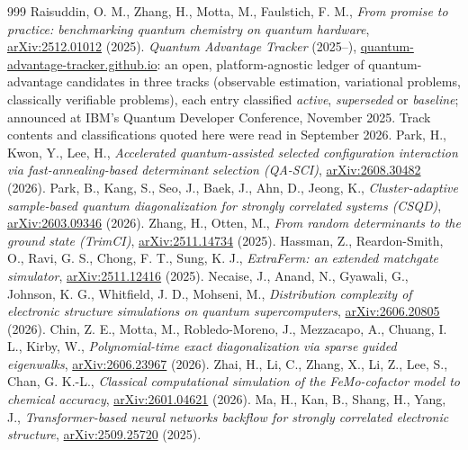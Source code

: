 \documentclass[onecolumn,a4paper]{quantumarticle}
\begin{document}
\begin{thebibliography}{999}
 Raisuddin, O. M., Zhang, H., Motta, M., Faulstich, F. M., \emph{From promise to practice: benchmarking quantum chemistry on quantum hardware}, \href{https://arxiv.org/abs/2512.01012}{arXiv:2512.01012} (2025).
 \emph{Quantum Advantage Tracker} (2025--), \href{https://quantum-advantage-tracker.github.io/}{quantum-advantage-tracker.github.io}: an open, platform-agnostic ledger of quantum-advantage candidates in three tracks (observable estimation, variational problems, classically verifiable problems), each entry classified \emph{active}, \emph{superseded} or \emph{baseline}; announced at IBM's Quantum Developer Conference, November 2025. Track contents and classifications quoted here were read in September 2026.
 Park, H., Kwon, Y., Lee, H., \emph{Accelerated quantum-assisted selected configuration interaction via fast-annealing-based determinant selection (QA-SCI)}, \href{https://arxiv.org/abs/2608.30482}{arXiv:2608.30482} (2026).
 Park, B., Kang, S., Seo, J., Baek, J., Ahn, D., Jeong, K., \emph{Cluster-adaptive sample-based quantum diagonalization for strongly correlated systems (CSQD)}, \href{https://arxiv.org/abs/2603.09346}{arXiv:2603.09346} (2026).
 Zhang, H., Otten, M., \emph{From random determinants to the ground state (TrimCI)}, \href{https://arxiv.org/abs/2511.14734}{arXiv:2511.14734} (2025).
 Hassman, Z., Reardon-Smith, O., Ravi, G. S., Chong, F. T., Sung, K. J., \emph{ExtraFerm: an extended matchgate simulator}, \href{https://arxiv.org/abs/2511.12416}{arXiv:2511.12416} (2025).
 Necaise, J., Anand, N., Gyawali, G., Johnson, K. G., Whitfield, J. D., Mohseni, M., \emph{Distribution complexity of electronic structure simulations on quantum supercomputers}, \href{https://arxiv.org/abs/2606.20805}{arXiv:2606.20805} (2026).
 Chin, Z. E., Motta, M., Robledo-Moreno, J., Mezzacapo, A., Chuang, I. L., Kirby, W., \emph{Polynomial-time exact diagonalization via sparse guided eigenwalks}, \href{https://arxiv.org/abs/2606.23967}{arXiv:2606.23967} (2026).
 Zhai, H., Li, C., Zhang, X., Li, Z., Lee, S., Chan, G. K.-L., \emph{Classical computational simulation of the FeMo-cofactor model to chemical accuracy}, \href{https://arxiv.org/abs/2601.04621}{arXiv:2601.04621} (2026).
 Ma, H., Kan, B., Shang, H., Yang, J., \emph{Transformer-based neural networks backflow for strongly correlated electronic structure}, \href{https://arxiv.org/abs/2509.25720}{arXiv:2509.25720} (2025).

\end{thebibliography}
\end{document}
